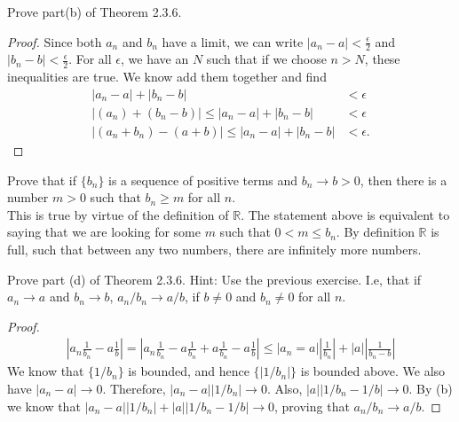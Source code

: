\documentclass[12pt]{article}
\newenvironment{exercise}[2][Exercise]{\begin{trivlist}
\item[\hskip \labelsep {\bfseries #1}\hskip \labelsep {\bfseries #2.}]}{\end{trivlist}}
\begin{document}
\begin{exercise}{2.3.7}
Prove part(b) of Theorem 2.3.6. 

\begin{proof}
	Since both $a_n$ and $b_n$ have a limit, we can write $|a_n -a| < \frac{\epsilon}{2}$ and $|b_n - b| < \frac{\epsilon}{2}$. For all $\epsilon$, we have an $N$ such that if we choose $n>N$, these inequalities are true. We know add them together and find
	\begin{align*}
	|a_n - a| + |b_n - b| &< \epsilon \\
	|(a_n) + (b_n -b) | \leq |a_n - a| + |b_n - b| &< \epsilon \\
	|(a_n + b_n) - (a+b) | \leq |a_n - a| + |b_n - b| &< \epsilon.
	\end{align*} 
\end{proof}
\end{exercise}


\begin{exercise}{2.3.8}
Prove that if $\{b_n\}$ is a sequence of positive terms and $b_n \to b > 0$, then there is a number $m>0$ such that $b_n \geq m$ for all $n$. \\

This is true by virtue of the definition of $\mathbb{R}$. The statement above is equivalent to saying that we are looking for some $m$ such that $0 < m \leq b_n$. By definition $\mathbb{R}$ is full, such that between any two numbers, there are infinitely more numbers.
\end{exercise}


\begin{exercise}{2.3.9}
Prove part (d) of Theorem 2.3.6. Hint: Use the previous exercise. I.e, that if $a_n \to a$ and $b_n \to b$, $a_n/b_n \to a/b$, if $b \neq 0$ and $b_n \neq 0$ for all $n$. 

	\begin{proof}
		\begin{align*}
		|a_n \frac{1}{b_n} - a \frac{1}{b}| = |a_n \frac{1}{b_n} - a \frac{1}{b_n} + a \frac{1}{b_n} - a \frac{1}{b} | \leq |a_n = a| |\frac{1}{b_n}| + |a| |\frac{1}{b_n -b}|
		\end{align*}
		We know that $\{1/b_n\}$ is bounded, and hence $\{|1/b_n|\}$ is bounded above. We also have $|a_n -a| \to 0$. Therefore, $|a_n -a| |1/b_n| \to 0$. Also, $ |a| |1/b_n - 1/b| \to 0$. By (b) we know that $ |a_n - a| |1/b_n| + |a| |1/b_n - 1/b| \to 0$, proving that $a_n/b_n \to a/b$.
	\end{proof}
\end{exercise}
\end{document}
